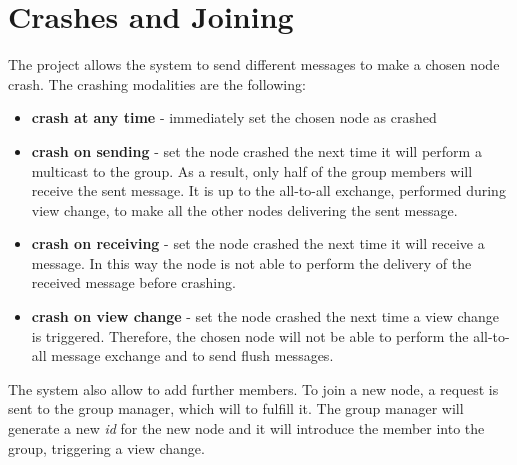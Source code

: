 \documentclass[11pt]{article}
\begin{document}
	\section{Crashes and Joining}
	The project allows the system to send different messages to make a chosen node crash. The crashing modalities are the following:
	
	\begin{itemize}
		\item \textbf{crash at any time} - immediately set the chosen node as crashed
		\item \textbf{crash on sending} - set the node crashed the next time it will perform a multicast to the group. As a result, only half of the group members will receive the sent message. It is up to the all-to-all exchange, performed during view change, to make all the other nodes delivering the sent message.
		\item \textbf{crash on receiving} - set the node crashed the next time it will receive a message. In this way the node is not able to perform the delivery of the received message before crashing.
		\item \textbf{crash on view change} - set the node crashed the next time a view change is triggered. Therefore, the chosen node will not be able to perform the all-to-all message exchange and to send flush messages.
	\end{itemize}
	
	The system also allow to add further members. To join a new node, a request is sent to the group manager, which will to fulfill it. The group manager will generate a new \textit{id} for the new node and it will introduce the member into the group, triggering a view change.
		
\end{document}
